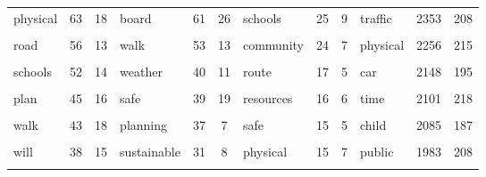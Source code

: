 \documentclass[]{elsarticle} %
\begin{document}
\begin{table}
{\begin{tabular}[t]{lcclcclcclcc}
physical & 63 & 18 & board & 61 & 26 & schools & 25 & 9 & traffic & 2353 & 208\\
\cellcolor{gray!6}{traffic} & \cellcolor{gray!6}{59} & \cellcolor{gray!6}{20} & \cellcolor{gray!6}{walking} & \cellcolor{gray!6}{57} & \cellcolor{gray!6}{17} & \cellcolor{gray!6}{children} & \cellcolor{gray!6}{25} & \cellcolor{gray!6}{6} & \cellcolor{gray!6}{choice} & \cellcolor{gray!6}{2299} & \cellcolor{gray!6}{169}\\
road & 56 & 13 & walk & 53 & 13 & community & 24 & 7 & physical & 2256 & 215\\
\addlinespace
\cellcolor{gray!6}{activity} & \cellcolor{gray!6}{55} & \cellcolor{gray!6}{14} & \cellcolor{gray!6}{district} & \cellcolor{gray!6}{50} & \cellcolor{gray!6}{23} & \cellcolor{gray!6}{bus} & \cellcolor{gray!6}{18} & \cellcolor{gray!6}{4} & \cellcolor{gray!6}{trips} & \cellcolor{gray!6}{2194} & \cellcolor{gray!6}{170}\\
schools & 52 & 14 & weather & 40 & 11 & route & 17 & 5 & car & 2148 & 195\\
\cellcolor{gray!6}{children} & \cellcolor{gray!6}{47} & \cellcolor{gray!6}{15} & \cellcolor{gray!6}{safety} & \cellcolor{gray!6}{40} & \cellcolor{gray!6}{19} & \cellcolor{gray!6}{zone} & \cellcolor{gray!6}{16} & \cellcolor{gray!6}{6} & \cellcolor{gray!6}{safety} & \cellcolor{gray!6}{2140} & \cellcolor{gray!6}{204}\\
plan & 45 & 16 & safe & 39 & 19 & resources & 16 & 6 & time & 2101 & 218\\
\cellcolor{gray!6}{students} & \cellcolor{gray!6}{44} & \cellcolor{gray!6}{14} & \cellcolor{gray!6}{services} & \cellcolor{gray!6}{37} & \cellcolor{gray!6}{17} & \cellcolor{gray!6}{day} & \cellcolor{gray!6}{16} & \cellcolor{gray!6}{4} & \cellcolor{gray!6}{factors} & \cellcolor{gray!6}{2101} & \cellcolor{gray!6}{216}\\
\addlinespace
walk & 43 & 18 & planning & 37 & 7 & safe & 15 & 5 & child & 2085 & 187\\
\cellcolor{gray!6}{public} & \cellcolor{gray!6}{39} & \cellcolor{gray!6}{15} & \cellcolor{gray!6}{parents} & \cellcolor{gray!6}{32} & \cellcolor{gray!6}{17} & \cellcolor{gray!6}{planning} & \cellcolor{gray!6}{15} & \cellcolor{gray!6}{4} & \cellcolor{gray!6}{walk} & \cellcolor{gray!6}{2008} & \cellcolor{gray!6}{200}\\
will & 38 & 15 & sustainable & 31 & 8 & physical & 15 & 7 & public & 1983 & 208\\
\cellcolor{gray!6}{community} & \cellcolor{gray!6}{37} & \cellcolor{gray!6}{19} & \cellcolor{gray!6}{may} & \cellcolor{gray!6}{30} & \cellcolor{gray!6}{13} & \cellcolor{gray!6}{healthy} & \cellcolor{gray!6}{14} & \cellcolor{gray!6}{6} & \cellcolor{gray!6}{age} & \cellcolor{gray!6}{1783} & \cellcolor{gray!6}{211}\\

\end{tabular}}
\end{table}
\end{document}
